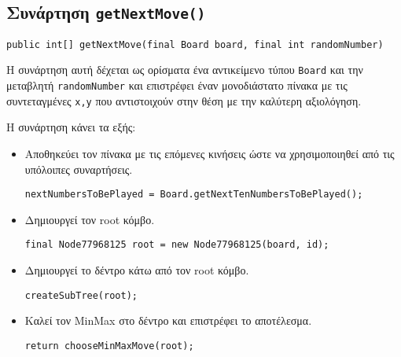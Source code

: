\subsection{Συνάρτηση \texttt{getNextMove()}}
\begin{lstlisting}[style=declaration]
public int[] getNextMove(final Board board, final int randomNumber)
\end{lstlisting}
Η συνάρτηση αυτή δέχεται ως ορίσματα ένα αντικείμενο τύπου \lstinline!Board! και
την μεταβλητή \lstinline!randomNumber! και επιστρέφει έναν
μονοδιάστατο πίνακα με τις συντεταγμένες \lstinline!x,y!
που αντιστοιχούν στην θέση με την καλύτερη αξιολόγηση.

Η συνάρτηση κάνει τα εξής:
\begin{itemize}
\item Αποθηκεύει τον πίνακα με τις επόμενες κινήσεις ώστε να χρησιμοποιηθεί από τις υπόλοιπες συναρτήσεις.
\begin{lstlisting}[style=chunk]
nextNumbersToBePlayed = Board.getNextTenNumbersToBePlayed();
\end{lstlisting}

\item Δημιουργεί τον root κόμβο.
\begin{lstlisting}[style=chunk]
final Node77968125 root = new Node77968125(board, id);
\end{lstlisting}

\item Δημιουργεί το δέντρο κάτω από τον root κόμβο.
\begin{lstlisting}[style=chunk]
createSubTree(root);
\end{lstlisting}

\item Καλεί τον MinMax στο δέντρο και επιστρέφει το αποτέλεσμα.
\begin{lstlisting}[style=chunk]
return chooseMinMaxMove(root);
\end{lstlisting}
\end{itemize}

